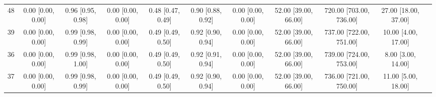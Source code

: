 \documentclass[8pt]{article}
\begin{document}
\begin{center}
\begin{footnotesize}
\begin{longtable}{|ccccccccccc|}
 48 &  0.00 [0.00, 0.00] &  0.96 [0.95, 0.98] &  0.00 [0.00, 0.00] &  0.48 [0.47, 0.49] &  0.90 [0.88, 0.92] &     0.00 [0.00, 0.00] &  52.00 [39.00, 66.00] &  720.00 [703.00, 736.00] &     27.00 [18.00, 37.00] \\
 39 &  0.00 [0.00, 0.00] &  0.99 [0.98, 0.99] &  0.00 [0.00, 0.00] &  0.49 [0.49, 0.50] &  0.92 [0.90, 0.94] &     0.00 [0.00, 0.00] &  52.00 [39.00, 66.00] &  737.00 [722.00, 751.00] &      10.00 [4.00, 17.00] \\
 36 &  0.00 [0.00, 0.00] &  0.99 [0.98, 1.00] &  0.00 [0.00, 0.00] &  0.49 [0.49, 0.50] &  0.92 [0.91, 0.94] &     0.00 [0.00, 0.00] &  52.00 [39.00, 66.00] &  739.00 [724.00, 753.00] &       8.00 [3.00, 14.00] \\
 37 &  0.00 [0.00, 0.00] &  0.99 [0.98, 0.99] &  0.00 [0.00, 0.00] &  0.49 [0.49, 0.50] &  0.92 [0.90, 0.94] &     0.00 [0.00, 0.00] &  52.00 [39.00, 66.00] &  736.00 [721.00, 750.00] &      11.00 [5.00, 18.00] \\
\end{longtable}
\end{footnotesize}
\end{center}
\end{document}

